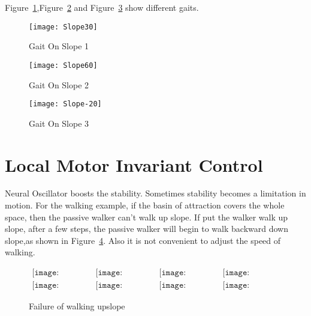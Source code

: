 Figure~\ref{fig:ss1},Figure~\ref{fig:ss2} and Figure~\ref{fig:ss3} show different gaits.

\begin{figure}[!htbp]
  \begin{center}
      \texttt{[image: Slope30]}
    \caption{Gait On Slope 1} 
    \label{fig:ss1}
\end{center}
\end{figure}

\begin{figure}[!htbp]
  \begin{center}
      \texttt{[image: Slope60]}
    \caption{Gait On Slope 2}
    \label{fig:ss2}
\end{center}
\end{figure}

\begin{figure}[!htbp]
  \begin{center}
      \texttt{[image: Slope-20]}
    \caption{Gait On Slope 3}
    \label{fig:ss3}
\end{center}
\end{figure}






\section{Local Motor Invariant Control}
Neural Oscillator boosts the stability.
Sometimes stability becomes a limitation in motion.
For the walking example, if the basin of attraction covers the whole space, then the passive walker can't walk up slope.
If put the walker walk up slope, after a few steps, the passive walker will begin to walk backward down slope,as shown in Figure~\ref{fig:localcontrolwalking}.
Also it is not convenient to adjust the speed of walking.




\begin{figure}[!htbp]
  \begin{center}
         $\begin{array}{cccc}
\texttt{[image: UpFall/0001.eps]}&
\texttt{[image: UpFall/0051.eps]}&
\texttt{[image: UpFall/0101.eps]}&
\texttt{[image: UpFall/0151.eps]}
\\
\texttt{[image: UpFall/0201.eps]}&
\texttt{[image: UpFall/0251.eps]}&
\texttt{[image: UpFall/0301.eps]}&
\texttt{[image: UpFall/0351.eps]}
\end{array}$
    \caption{Failure of walking upslope}
    \label{fig:localcontrolwalking}
\end{center}
\end{figure}

